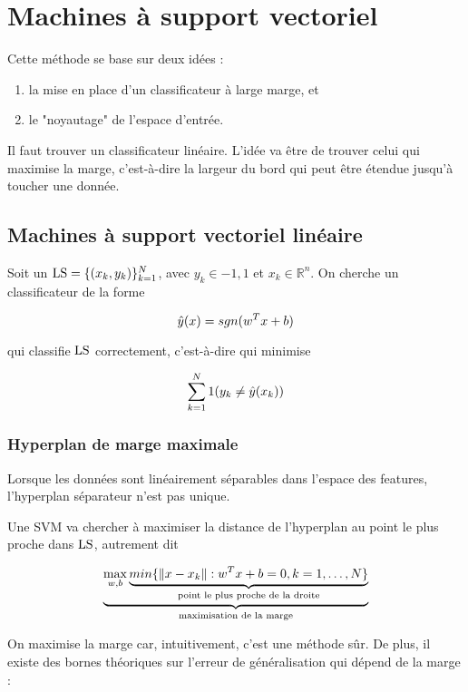 \chapter{Machines à support vectoriel}

Cette méthode se base sur deux idées :

\begin{enumerate}
	\item la mise en place d'un classificateur à large marge, et
	\item le "noyautage" de l'espace d'entrée.
\end{enumerate}

Il faut trouver un classificateur linéaire. L'idée va être de trouver celui qui maximise la marge, c'est-à-dire la largeur du bord qui peut être étendue jusqu'à toucher une donnée.


\section{Machines à support vectoriel linéaire}
	
	Soit un $\text{LS} = \lbrace (x_k, y_k) \rbrace^N_{k = 1}$, avec $y_k \in {-1, 1}$ et $x_k \in \mathbb{R}^n$. On cherche un classificateur de la forme
	
	$$\hat{y}(x) = sgn(w^T x + b)$$
	
	qui classifie $\text{LS}$ correctement, c'est-à-dire qui minimise
	
	$$\sum_{k = 1}^N1(y_k \neq \hat{y}(x_k))$$
	
	
	\subsection{Hyperplan de marge maximale}
	
	Lorsque les données sont linéairement séparables dans l'espace des features, l'hyperplan séparateur n'est pas unique.
	
	
	Une SVM va chercher à maximiser la distance de l'hyperplan au point le plus proche dans $\text{LS}$, autrement dit
	
	$$\underbrace{\max_{w, b} \underbrace{min \lbrace \Vert x - x_k \Vert : w^T x + b = 0, k = 1, \dots , N \rbrace}_{\text{point le plus proche de la droite}}}_{\text{maximisation de la marge}}$$
	
	On maximise la marge car, intuitivement, c'est une méthode sûr. De plus, il existe des bornes théoriques sur l'erreur de généralisation qui dépend de la marge :
	
